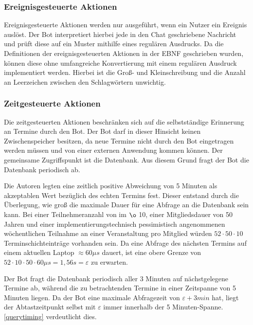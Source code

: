 \subsubsection{Ereignisgesteuerte Aktionen}

Ereignisgesteuerte Aktionen werden nur ausgeführt, wenn ein Nutzer ein Ereignis auslöst. Der Bot interpretiert hierbei jede in den Chat geschriebene Nachricht und prüft diese auf ein Muster mithilfe eines regulären Ausdrucks. Da die Definitionen der ereignisgesteuerten Aktionen in der EBNF geschrieben wurden, können diese ohne umfangreiche Konvertierung mit einem regulären Ausdruck implementiert werden. Hierbei ist die Groß- und Kleinschreibung und die Anzahl an Leerzeichen zwischen den Schlagwörtern unwichtig.

\subsubsection{Zeitgesteuerte Aktionen}

Die zeitgesteuerten Aktionen beschränken sich auf die selbstständige Erinnerung an Termine durch den Bot. Der Bot darf in dieser Hinsicht keinen Zwischenspeicher besitzen, da neue Termine nicht durch den Bot eingetragen werden müssen und von einer externen Anwendung kommen können. Der gemeinsame Zugriffspunkt ist die Datenbank. Aus diesem Grund fragt der Bot die Datenbank periodisch ab.

Die Autoren legten eine zeitlich positive Abweichung von 5 Minuten als akzeptablen Wert bezüglich des echten Termins fest. Dieser entstand durch die Überlegung, wie groß die maximale Dauer für eine Abfrage an die Datenbank sein kann. Bei einer Teilnehmeranzahl von im $\o$ 10, einer Mitgliedsdauer von 50 Jahren und einer implementierungstechnisch pessimistisch angenommenen wöchentlichen Teilnahme an einer Veranstaltung pro Mitglied würden $52 \cdot 50 \cdot 10$ Terminschichteinträge vorhanden sein. Da eine Abfrage des nächsten Termins auf einem aktuellen Laptop $\approx 60\mu s$ dauert, ist eine obere Grenze von $52 \cdot 10 \cdot 50 \cdot 60 \mu s=1,56s=\varepsilon $ zu erwarten.

Der Bot fragt die Datenbank periodisch aller 3 Minuten auf nächstgelegene Termine ab, während die zu betrachtenden Termine in einer Zeitspanne von 5 Minuten liegen. Da der Bot eine maximale Abfragezeit von $\varepsilon + 3min$ hat, liegt der Abtastzeitpunkt selbst mit $\varepsilon$ immer innerhalb der 5 Minuten-Spanne. \autoref{querytiming} verdeutlicht dies.
 
